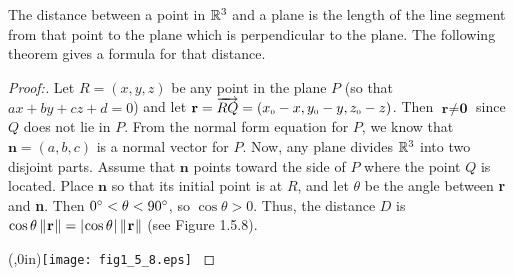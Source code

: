 The distance between a point in $\mathbb{R}^{3}$ and a plane is the length of the line segment from that point to the plane
which is perpendicular to the plane. The following theorem gives a formula for that distance.
\begin{proofbar}\vspace{-3mm}\begin{proof}[Proof:]
 \par\noindent Let $R = (x,y,z)$ be any point in the plane $P$ (so that $ax + by + cz + d = 0$)
 and let $\textbf{r} = \overrightarrow{RQ} =
 (x_{\scriptscriptstyle 0} - x,y_{\scriptscriptstyle 0} - y,z_{\scriptscriptstyle 0} - z)$. Then $\textbf{r} \ne \textbf{0}$ since $Q$ does not lie in $P$.
 From the normal form equation for $P$, we know that $\textbf{n} = (a,b,c)$ is a normal vector for $P$. Now, any plane
 divides $\mathbb{R}^{3}$ into two disjoint parts. Assume that $\textbf{n}$ points toward the side of $P$ where the point
 $Q$ is located. Place $\textbf{n}$ so that its initial point is at $R$, and let $\theta$ be the angle between
 \textbf{r} and \textbf{n}. Then $0^\circ < \theta < 90^\circ$, so $\cos \theta > 0$. Thus, the distance $D$ is
 $\cos \theta \,\lVert\mspace{1mu}\textbf{r}\mspace{1mu}\rVert = \lvert\mspace{1mu}\cos \theta\mspace{1mu}\rvert\,\lVert\mspace{1mu}\textbf{r}\mspace{1mu}\rVert$ (see Figure 1.5.8).

 \piccaption[]{}\parpic(\textwidth,0in){\texttt{[image: fig1\_5\_8.eps]}
 \piccaptioninside}
 \par\mbox{}\newline\vspace{1mm}


\end{proof}
\end{proofbar}
